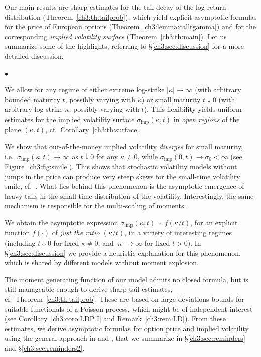 \documentclass[a4paper,reqno,11pt]{amsart}
\numberwithin{equation}{section}
\newenvironment{myitemize}{%
\begin{list}{$\bullet$}%
 	{%
	\setlength{\itemsep}{0.4em}%
	\setlength{\topsep}{0.5em}%
	\setlength\leftmargin{2.45em}%
	\setlength\labelwidth{2.05em}%
	\setlength{\labelsep}{0.4em}%
	}%
	}%
{\end{list}}
\renewenvironment{itemize}{
\begin{myitemize}}%
{\end{myitemize}}
\newcommand\imp{\mathrm{imp}}
\begin{document}
\smallskip

Our main results are sharp estimates for the tail decay of the log-return distribution
(Theorem~\ref{ch3:th:tailprob}), which yield
explicit asymptotic formulas for the price
of European options (Theorem~\ref{ch3:lemma:calltgamma}) and for the corresponding
\emph{implied volatility surface} (Theorem~\ref{ch3:th:main}).
Let us summarize some of the highlights,
referring to \S\ref{ch3:sec:discussion} for a more detailed discussion.
\begin{itemize}
\item We allow for any regime of either extreme log-strike $|\kappa| \to \infty$
(with arbitrary bounded maturity $t$, possibly varying with $\kappa$) or
small maturity $t \downarrow 0$ (with arbitrary log-strike $\kappa$, possibly varying with $t$).
This flexibility yields uniform estimates for
the implied volatility surface $\sigma_\imp(\kappa,t)$
in \emph{open regions} of the plane $(\kappa,t)$, cf.\ Corollary~\ref{ch3:th:surface}.

\item We show that
out-of-the-money implied volatility \emph{diverges} for small maturity, i.e.\
$\sigma_\imp(\kappa,t) \to \infty$ as
$t \downarrow 0$ for any $\kappa \ne 0$, while $\sigma_\imp(0,t) \to \sigma_0 < \infty$
(see Figure~\ref{ch3:fig:smile}).
This shows that stochastic volatility models
without jumps in the price can produce very steep skews for the small-time volatility smile,
cf.\ \cite[Chapter 5, ``Why jumps are needed'']{cf:Gat}.
What lies behind this phenomenon is the asymptotic emergence of heavy tails
in the small-time distribution of the volatility.
Interestingly, the same mechanism is responsible for the multi-scaling of moments.


\item We obtain the asymptotic expression
$\sigma_\imp(\kappa,t) \sim f(\kappa/t)$, for an explicit function
$f(\cdot)$ of \emph{just the ratio $(\kappa/t)$}, in a variety of interesting regimes
(including $t \downarrow 0$ for fixed $\kappa \ne 0$,
and $|\kappa| \to \infty$ for fixed $t > 0$).
In \S\ref{ch3:sec:discussion}
we provide a heuristic explanation for this phenomenon,
which is shared by different models
without moment explosion.
\end{itemize}

The moment generating function of our model admits no closed formula,
but is still manageable enough to derive sharp tail estimates, cf.\ Theorem~\ref{ch3:th:tailprob}.
These are based on large deviations bounds for suitable
functionals of a Poisson process, which might be of independent interest
(see Corollary~\ref{ch3:coro:LDP I} and
Remark~\ref{ch3:rem:LD}).
From these estimates, we derive asymptotic formulas for option price and implied volatility
using the general approach in \cite{cf:GL} and \cite{cf:CC},
that we summarize in \S\ref{ch3:sec:reminders} and \S\ref{ch3:sec:reminders2}.
\end{document}
